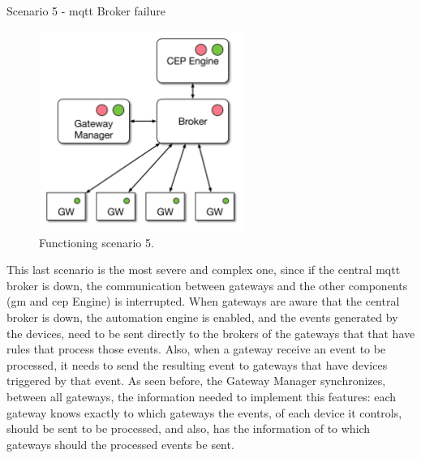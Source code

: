 \begin{Paragraph}{Scenario 5 - \ac{mqtt} Broker failure}
	\begin{figure}[H]
		\centering
		\includegraphics[width=0.6\textwidth]{figures/fs3.png}
		\caption{Functioning scenario 5.}
		\label{fig:fs3}
	\end{figure}

This last scenario is the most severe and complex one, since if the central \ac{mqtt} broker is down, the communication between gateways and the other components (\ac{gm} and \ac{cep} Engine) is interrupted. When gateways are aware that the central broker is down, the automation engine is enabled, and the events generated by the devices, need to be sent directly to the brokers of the gateways that that have rules that process those events. Also, when a gateway receive an event to be processed, it needs to send the resulting event to gateways that have devices triggered by that event. As seen before, the Gateway Manager synchronizes, between all gateways, the information needed to implement this features: each gateway knows exactly to which gateways the events, of each device it controls, should be sent to be processed, and also, has the information of to which gateways should the processed events be sent.

\end{Paragraph}


